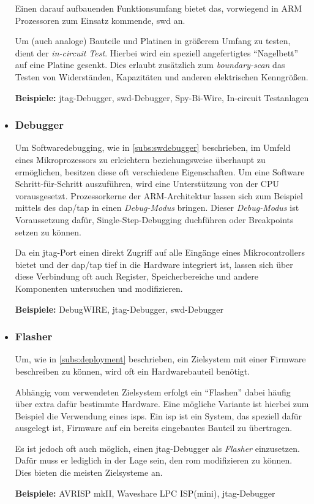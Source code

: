 \begin{itemize}
  Einen darauf aufbauenden Funktionsumfang bietet das, vorwiegend in ARM
  Prozessoren zum Einsatz kommende, \gls{swd}\cite{SWD} an.
  
  Um (auch analoge) Bauteile und Platinen in größerem Umfang zu testen, dient
  der \emph{in-circuit Test}. Hierbei wird ein speziell angefertigtes
  "`Nagelbett"' auf eine Platine gesenkt. Dies erlaubt zusätzlich zum
  \emph{boundary-scan} das Testen von Widerständen, Kapazitäten und anderen
  elektrischen Kenngrößen.
   
  \textbf{Beispiele:} \gls{jtag}-Debugger, \gls{swd}-Debugger, Spy-Bi-Wire,
  In-circuit Testanlagen
  \item \subsubsection*{Debugger}\label{subs:hwdebugger}  Um
  Softwaredebugging, wie in \autoref{subs:swdebugger} beschrieben, im Umfeld
  eines Mikroprozessors zu erleichtern beziehungsweise überhaupt zu ermöglichen,
  besitzen diese oft verschiedene Eigenschaften.
  Um eine Software Schritt-für-Schritt auszuführen, wird eine Unterstützung von
  der CPU vorausgesetzt. Prozessorkerne der ARM-Architektur lassen sich
  zum Beispiel mittels des \gls{dap}/\gls{tap} in einen \emph{Debug-Modus}
  bringen. Dieser \emph{Debug-Modus} ist Voraussetzung dafür,
  Single-Step-Debugging duchführen oder Breakpoints setzen zu können.
  
  Da ein \gls{jtag}-Port einen direkt Zugriff auf alle Eingänge eines
  Mikrocontrollers bietet und der \gls{dap}/\gls{tap} tief in die Hardware
  integriert ist, lassen sich über diese Verbindung oft auch Register,
  Speicherbereiche und andere Komponenten untersuchen und modifizieren. 
  
  \textbf{Beispiele:} DebugWIRE, \gls{jtag}-Debugger, \gls{swd}-Debugger
  \item \subsubsection*{Flasher} Um, wie in \autoref{subs:deployment}
  beschrieben, ein Zielsystem mit einer Firmware beschreiben zu können, wird
  oft ein Hardwarebauteil benötigt.
  
  Abhängig vom verwendeten Zielsystem erfolgt ein "`Flashen"' dabei häufig über
  extra dafür bestimmte Hardware. Eine mögliche Variante ist hierbei zum
  Beispiel die Verwendung eines \glspl{isp}. Ein \gls{isp} ist ein System, das
  speziell dafür ausgelegt ist, Firmware auf ein bereits eingebautes Bauteil zu
  übertragen.
  
  Es ist jedoch oft auch möglich, einen \gls{jtag}-Debugger als \emph{Flasher}
  einzusetzen. Dafür muss er lediglich in der Lage sein, den \gls{rom}
  modifizieren zu können. Dies bieten die meisten Zielsysteme an.

  \textbf{Beispiele:} AVRISP mkII, Waveshare LPC ISP(mini), \gls{jtag}-Debugger
\end{itemize}\clearpage
